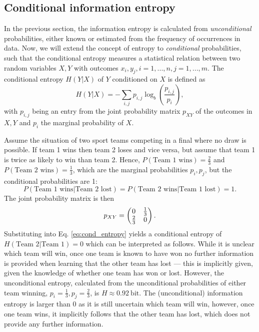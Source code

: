 \subsection{Conditional information entropy}
\label{sec:cond_entropy}

In the previous section, the information entropy is calculated from \emph{unconditional} probabilities, either known or estimated
from the frequency of occurrences in data. Now, we will extend the concept of entropy to \emph{conditional} probabilities, such
that the conditional entropy measures a statistical relation between two random variables $X,Y$ with outcomes $x_i,y_j,
i = 1,...,n, j = 1,...,m$. The conditional entropy $H(Y\vert X)$ of $Y$ conditioned on $X$ is defined as
\begin{equation}
	H(Y \vert X) = - \sum_{i,j} p_{i,j} \log_b \left( \frac{p_{i,j}}{p_i} \right),
	\label{eq:cond_entropy}
\end{equation}
with $p_{i,j}$ being an entry from the joint probability matrix $p_{XY}$ of the outcomes in $X,Y$ and $p_i$ the marginal probability of $X$.

Assume the situation of two sport teams competing in a final where no draw is possible. If team 1 wins then team 2 loses and vice versa,
but assume that team 1 is twice as likely to win than team 2. Hence, $P(\text{Team 1 wins}) = \tfrac{2}{3}$ and $P(\text{Team 2 wins})
= \tfrac{1}{3}$, which are the marginal probabilities $p_i,p_j$, but the conditional probabilities are 1:
\begin{equation}
P(\text{Team 1 wins}\vert \text{Team 2 lost}) = P(\text{Team 2 wins}\vert \text{Team 1 lost}) = 1.
\end{equation}
The joint probability matrix is then
\begin{equation}
	p_{XY} = \begin{pmatrix} 0 & \tfrac{1}{3} \\
				\tfrac{2}{3} & 0 \end{pmatrix}.
\end{equation}
Substituting into Eq. \ref{eq:cond_entropy} yields a conditional entropy of $H(\text{Team 2} \vert \text{Team 1}) = 0$ which can be
interpreted as follows. While it is unclear which team will win, once one team is known to have won no further information is 
provided when learning that the other team has lost --- this is implicitly given, given the knowledge of whether one team has won or lost.
However, the unconditional entropy, calculated from the unconditional probabilities of either team winning, $p_i = \tfrac{1}{3},
p_j = \tfrac{2}{3}$, is $H \approx 0.92~\mathrm{bit}$. The (unconditional) information entropy is larger than 0 as it is
still uncertain which team will win, however, once one team wins, it implicitly follows that the other team has lost, which does not
provide any further information. 

